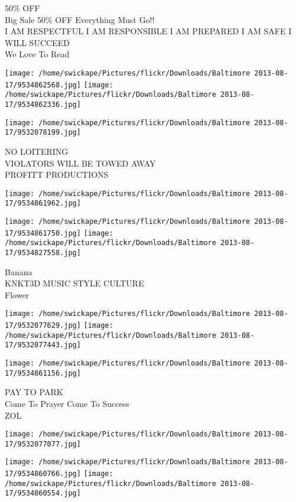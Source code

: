 \documentclass[10pt,letterpaper]{article}
\begin{document}
50\% OFF\\
Big Sale 50\% OFF Everything Must Go!!\\
I AM RESPECTFUL I AM RESPONSIBLE I AM PREPARED I AM SAFE I WILL SUCCEED\\
We Love To Read\\
\pagebreak

\texttt{[image: /home/swickape/Pictures/flickr/Downloads/Baltimore 2013-08-17/9534862568.jpg]}
\texttt{[image: /home/swickape/Pictures/flickr/Downloads/Baltimore 2013-08-17/9534862336.jpg]}

\vspace{0.25in}
\texttt{[image: /home/swickape/Pictures/flickr/Downloads/Baltimore 2013-08-17/9532078199.jpg]}

NO LOITERING\\
VIOLATORS WILL BE TOWED AWAY\\
PROFITT PRODUCTIONS\\
\pagebreak

\texttt{[image: /home/swickape/Pictures/flickr/Downloads/Baltimore 2013-08-17/9534861962.jpg]}

\vspace{0.25in}
\texttt{[image: /home/swickape/Pictures/flickr/Downloads/Baltimore 2013-08-17/9534861750.jpg]}
\texttt{[image: /home/swickape/Pictures/flickr/Downloads/Baltimore 2013-08-17/9534827558.jpg]}

Banana\\
KNKT3D MUSIC STYLE CULTURE\\
Flower\\
\pagebreak

\texttt{[image: /home/swickape/Pictures/flickr/Downloads/Baltimore 2013-08-17/9532077629.jpg]}
\texttt{[image: /home/swickape/Pictures/flickr/Downloads/Baltimore 2013-08-17/9532077443.jpg]}

\texttt{[image: /home/swickape/Pictures/flickr/Downloads/Baltimore 2013-08-17/9534861156.jpg]}

PAY TO PARK\\
Come To Prayer Come To Success\\
ZOL\\
\pagebreak

\texttt{[image: /home/swickape/Pictures/flickr/Downloads/Baltimore 2013-08-17/9532077077.jpg]}

\vspace{0.25in}
\texttt{[image: /home/swickape/Pictures/flickr/Downloads/Baltimore 2013-08-17/9534860766.jpg]}
\texttt{[image: /home/swickape/Pictures/flickr/Downloads/Baltimore 2013-08-17/9534860554.jpg]}
\end{document}
